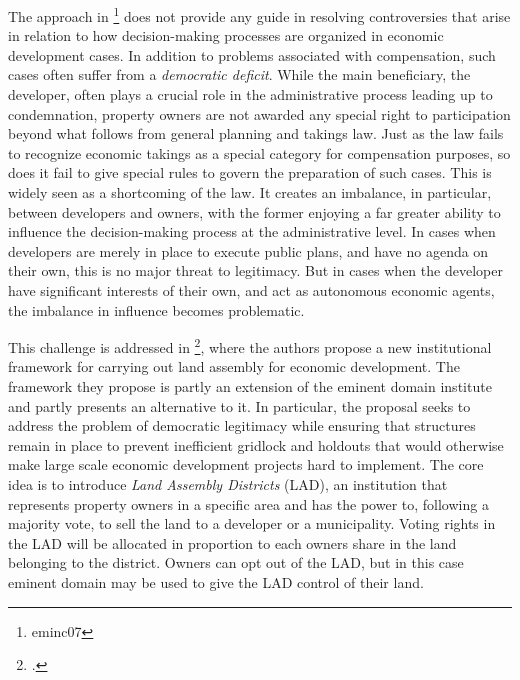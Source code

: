 The approach in \footnote{eminc07} does not provide any guide in resolving controversies that arise in relation to how decision-making processes are organized in economic development cases. In addition to problems associated with compensation, such cases often suffer from a {\it democratic deficit}. While the main beneficiary, the developer, often plays a crucial role in the administrative process leading up to condemnation, property owners are not awarded any special right to participation beyond what follows from general planning and takings law. Just as the law fails to recognize economic takings as a special category for compensation purposes, so does it fail to give special rules to govern the preparation of such cases. This is widely seen as a shortcoming of the law. It creates an imbalance, in particular, between developers and owners, with the former enjoying a far greater ability to influence the decision-making process at the administrative level. In cases when developers are merely in place to execute public plans, and have no agenda on their own, this is no major threat to legitimacy. But in cases when the developer have significant interests of their own, and act as autonomous economic agents, the imbalance in influence becomes problematic.

This challenge is addressed in \footcite{lad08}, where the authors propose a new institutional framework for carrying out land assembly for economic development. The framework they propose is partly an extension of the eminent domain institute and partly presents an alternative to it. In particular, the proposal seeks to address the problem of democratic legitimacy while ensuring that structures remain in place to prevent inefficient gridlock and holdouts that would otherwise make large scale economic development projects hard to implement. The core idea is to introduce {\it Land Assembly Districts} (LAD), an institution that represents property owners in a specific area and has the power to, following a majority vote, to sell the land to a developer or a municipality. Voting rights in the LAD will be allocated in proportion to each owners share in the land belonging to the district. Owners can opt out of the LAD, but in this case eminent domain may be used to give the LAD control of their land. 

